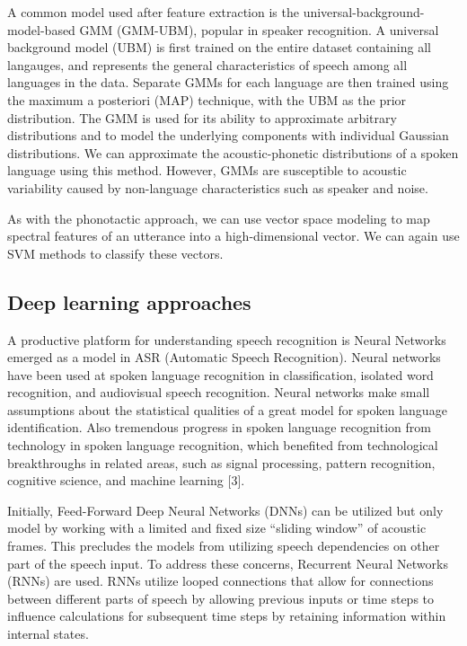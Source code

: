 \documentclass{llncs}
\begin{document}
A common model used after feature extraction is the universal-background-model-based GMM (GMM-UBM), popular in speaker recognition. A universal background model (UBM) is first trained on the entire dataset containing all langauges, and represents the general characteristics of speech among all languages in the data. Separate GMMs for each language are then trained using the maximum a posteriori (MAP) technique, with the UBM as the prior distribution. The GMM is used for its ability to approximate arbitrary distributions and to model the underlying components with individual Gaussian distributions. We can approximate the acoustic-phonetic distributions of a spoken language using this method. However, GMMs are susceptible to acoustic variability caused by non-language characteristics such as speaker and noise.

As with the phonotactic approach, we can use vector space modeling to map spectral features of an utterance into a high-dimensional vector. We can again use SVM methods to classify these vectors.

\subsection{Deep learning approaches}

A productive platform for understanding speech recognition is Neural Networks emerged as a model in ASR (Automatic Speech Recognition). Neural networks have been used at spoken language recognition in classification, isolated word recognition, and audiovisual speech recognition.  Neural networks make small assumptions about the statistical qualities of a great model for spoken language identification. Also tremendous progress in spoken language recognition from technology in spoken language recognition, which benefited from technological breakthroughs in related areas, such as signal processing, pattern recognition, cognitive science, and machine learning [3].

Initially, Feed-Forward Deep Neural Networks (DNNs) can be utilized but only model by working with a limited and fixed size “sliding window” of acoustic frames.  This precludes the models from utilizing speech dependencies on other part of the speech input.  To address these concerns, Recurrent Neural Networks (RNNs) are used.  RNNs utilize looped connections that allow for connections between different parts of speech by allowing previous inputs or time steps to influence calculations for subsequent time steps by retaining information within internal states.
\end{document}
